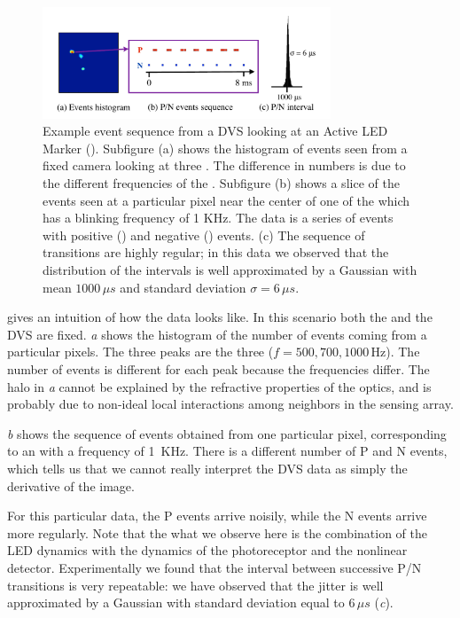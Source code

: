 \begin{figure}[b]
\begin{centering}
\includegraphics[width=8.6cm]{figures/slides/event_sequence}
\par\end{centering}

\caption{\label{fig:events-hist}Example event sequence from a DVS looking
at an Active LED Marker (\ALM). Subfigure (a) shows the histogram
of events seen from a fixed camera looking at three \ALMs. The difference
in numbers is due to the different frequencies of the \ALMs. Subfigure
(b) shows a slice of the events seen at a particular pixel near the
center of one of the \ALMs which has a blinking frequency of 1 KHz.
The data is a series of events with positive (\pP) and negative (\pN)
events. (c) The sequence of \pPN transitions are highly regular;
in this data we observed that the distribution of the intervals is
well approximated by a Gaussian with mean $1000\,\mu s$ and standard
deviation $\sigma=6\,\mu s$. }
\end{figure}


 gives an intuition of how the data looks
like. In this scenario both the \ALMs and the DVS are fixed. \emph{a}
shows the histogram of the number of events coming from a particular
pixels. The three peaks are the three \ALMs ($f=500,700,1000\,\mbox{Hz}$).
The number of events is different for each peak because the frequencies
differ. The halo in \emph{a} cannot be
explained by the refractive properties of the optics, and is probably
due to non-ideal local interactions among neighbors in the sensing
array.

\emph{b} shows the sequence of events
obtained from one particular pixel, corresponding to an \ALM  with
a frequency of 1~KHz. There is a different number of P and N events,
which tells us that we cannot really interpret the DVS data as simply
the derivative of the image. 

For this particular data, the P events arrive noisily, while the N
events arrive more regularly. Note that the what we observe here is
the combination of the LED dynamics with the dynamics of the photoreceptor
and the nonlinear detector. Experimentally we found that the interval
between successive P/N transitions is very repeatable: we have observed
that the jitter is well approximated by a Gaussian with standard deviation
equal to $6\,\mu s$ (\emph{c}).


